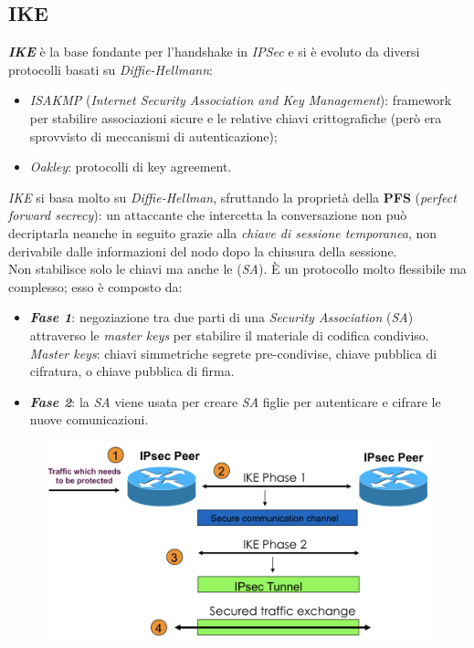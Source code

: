 \documentclass[11pt, a4paper, twoside, italian]{report}
\theoremstyle{plain}
\begin{document}
\subsection*{IKE}
\textit{\textbf{IKE}} è la base fondante per l'handshake in \textit{IPSec} e si è evoluto da diversi protocolli basati su \textit{Diffie-Hellmann}:
\begin{itemize}
	\item \textit{ISAKMP} (\textit{Internet Security Association and Key Management}): framework per stabilire associazioni sicure e le relative chiavi crittografiche (però era sprovvisto di meccanismi di autenticazione);
	\item \textit{Oakley}: protocolli di key agreement.
\end{itemize}
\textit{IKE} si basa molto su \textit{Diffie-Hellman}, sfruttando la proprietà della \textbf{PFS} (\textit{perfect forward secrecy}): un attaccante che intercetta la conversazione non può decriptarla neanche in seguito grazie alla \textit{chiave di sessione temporanea}, non derivabile dalle informazioni del nodo dopo la chiusura della sessione.\\
Non stabilisce solo le chiavi ma anche le (\textit{SA}). È un protocollo molto flessibile ma complesso; esso è composto da:
\begin{itemize}
	\item \textbf{\textit{Fase 1}}: negoziazione tra due parti di una \textit{Security Association} (\textit{SA}) attraverso le \textit{master keys} per stabilire il materiale di codifica condiviso.\\
	\textit{Master keys}: chiavi simmetriche segrete pre-condivise, chiave pubblica di cifratura, o chiave pubblica di firma.
	\item \textbf{\textit{Fase 2}}: la \textit{SA} viene usata per creare \textit{SA} figlie per autenticare e cifrare le nuove comunicazioni.
\end{itemize}
\begin{figure}[H]
	\centering
	\includegraphics[scale=0.35]{ikeroadmap}
\end{figure}
\end{document}
